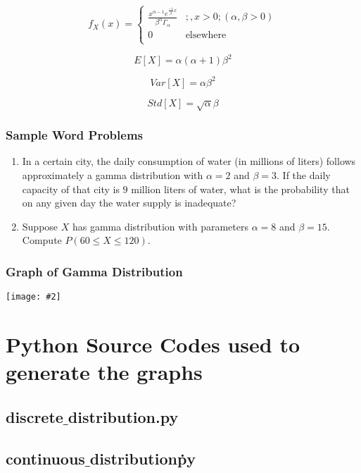 \documentclass[a4paper]{article}
\newcommand*{\newincludegraphics}[2][]{
    \begin{center}
        \begin{adjustbox}{max size={\textwidth}{\textheight}}
            \texttt{[image: \#2]}
        \end{adjustbox}
    \end{center}
}
\begin{document}
    \begin{equation}
        \label{eq:gamma_pdf}
        f_X(x) = \left\{
        \begin{array}{ll}
            {\frac{x^{\alpha - 1} e^{\frac{-1}{\beta}x}}{\beta^\alpha\Gamma_\alpha}} & ;, x > 0; (\alpha, \beta > 0) \\
            0 & \mbox{elsewhere} \\
        \end{array}
    \right.
    \end{equation}

    \begin{equation}
        \label{eq:gamma_mean}
        E[X] = \alpha (\alpha + 1) \beta^2
    \end{equation}

    \begin{equation}
        \label{eq:gamma_variance}
        Var[X] = \alpha \beta^2
    \end{equation}

    \begin{equation}
        \label{eq:gamma_std}
        Std[X] = \sqrt{\alpha} \beta
    \end{equation}

    \subsubsection*{Sample Word Problems}
    \begin{enumerate}
        \item In a certain city, the daily consumption of water (in millions of liters) follows approximately a gamma distribution with $\alpha = 2$ and $\beta = 3$. If the daily capacity of that city is $9$ million liters of water, what is the probability that on any given day the water supply is inadequate?
        \item Suppose $X$ has gamma distribution with parameters $\alpha = 8$ and $\beta = 15$. Compute $P(60 \le X \le 120)$.
    \end{enumerate}

    \subsubsection*{Graph of Gamma Distribution}
    \newincludegraphics[]{(C)-Gamma_distribution_visualization.png}


    \section{Python Source Codes used to generate the graphs}

    \subsection*{discrete$\_$distribution.py}
    

    \subsection*{continuous$\_$distribution\.py}
    
\end{document}
